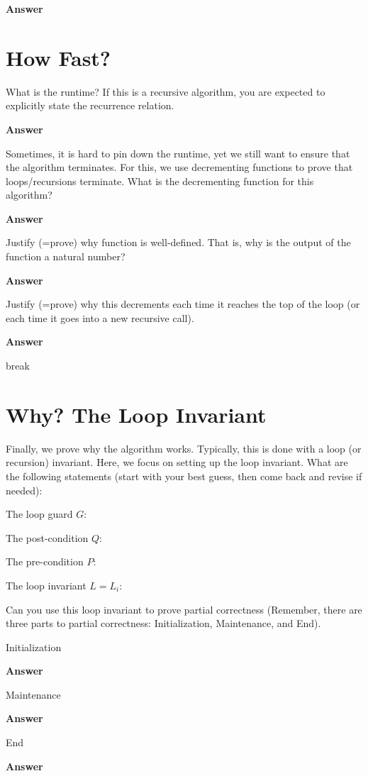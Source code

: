 \documentclass{article}
\begin{document}
\textbf{Answer}
\vspace{1in}

\pagebreak
\section{How Fast?}

What is the runtime?  If this is a recursive algorithm, you are expected to
explicitly state the recurrence relation.

\textbf{Answer}
\vspace{1in}

Sometimes, it is hard to pin down the runtime, yet we still want to ensure that
the algorithm terminates.  For this, we use decrementing functions to prove that
loops/recursions terminate.
What is the decrementing function for this algorithm?

\textbf{Answer}
\vspace{1in}

Justify (=prove) why function is well-defined.  That is, why is the output of
the function a natural number?

\textbf{Answer}
\vspace{1in}

Justify (=prove) why this decrements each time it reaches the top of the loop
(or each time it goes into a new recursive call).

\textbf{Answer}
\vspace{1in}


\page break
\section{Why? The Loop Invariant}

Finally, we prove why the algorithm works.  Typically, this is done with a loop
(or recursion) invariant.  Here, we focus on setting up the loop invariant.
What
are the following statements (start with your best guess, then come back and
revise if needed):

The loop guard $G$:
\vspace{0.5in}

The post-condition $Q$:
\vspace{0.5in}

The pre-condition $P$:
\vspace{0.5in}

The loop invariant $L=L_i$:
\vspace{0.5in}


Can you use this loop invariant
to prove partial correctness (Remember, there are three parts to partial
correctness: Initialization, Maintenance, and End).

Initialization

\textbf{Answer}
\vspace{1in}


Maintenance

\textbf{Answer}
\vspace{1in}


End

\textbf{Answer}
\vspace{1in}
\end{document}
